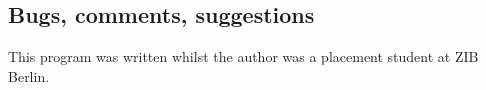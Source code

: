 \subsection{Bugs, comments, suggestions}
This program was written whilst the author was a placement student at ZIB Berlin.
